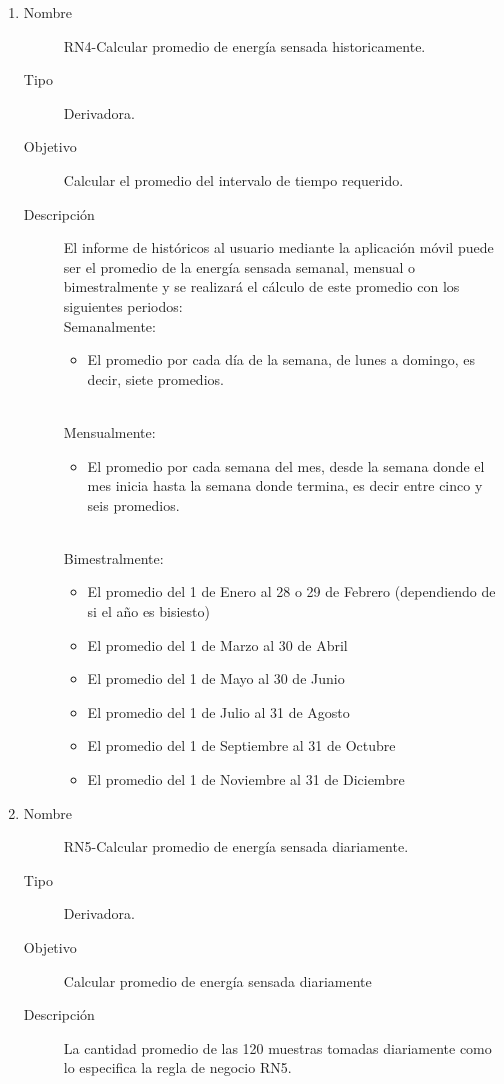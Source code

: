 \begin{enumerate}[label=RN\arabic*.]
\item \label{RN4}
		\begin{description}
			\item[Nombre] RN4-Calcular promedio de energía sensada historicamente.
			\item[Tipo] Derivadora.
			\item[Objetivo] Calcular el promedio del intervalo de tiempo requerido.
			\item[Descripción] El informe de históricos al usuario mediante la aplicación móvil puede ser el promedio de la energía sensada semanal, mensual o bimestralmente y se realizará el cálculo de este promedio con los siguientes periodos:
			\\ Semanalmente: 
			\begin{itemize}
				\item El promedio por cada día de la semana, de lunes a domingo, es decir, siete promedios.
			\end{itemize}
			\\ Mensualmente: 
			\begin{itemize}
				\item El promedio por cada semana del mes, desde la semana donde el mes inicia hasta la semana donde termina, es decir entre cinco y seis promedios.
			\end{itemize}
			\\ Bimestralmente: 
			\begin{itemize}
				\item El promedio del 1 de Enero al 28 o 29 de Febrero (dependiendo de si el año es bisiesto)
				\item El promedio del 1 de Marzo al 30 de Abril
				\item El promedio del 1 de Mayo al 30 de Junio
				\item El promedio del 1 de Julio al 31 de Agosto
				\item El promedio del 1 de Septiembre al 31 de Octubre
				\item El promedio del 1 de Noviembre al 31 de Diciembre
			\end{itemize}
		\end{description}

\item \label{RN5}
		\begin{description}
			\item[Nombre] RN5-Calcular promedio de energía sensada diariamente.
			\item[Tipo] Derivadora.
			\item[Objetivo] Calcular promedio de energía sensada diariamente
			\item[Descripción] La cantidad promedio de las 120 muestras tomadas diariamente como lo especifica la regla de negocio RN5.
		\end{description}


\end{enumerate}
